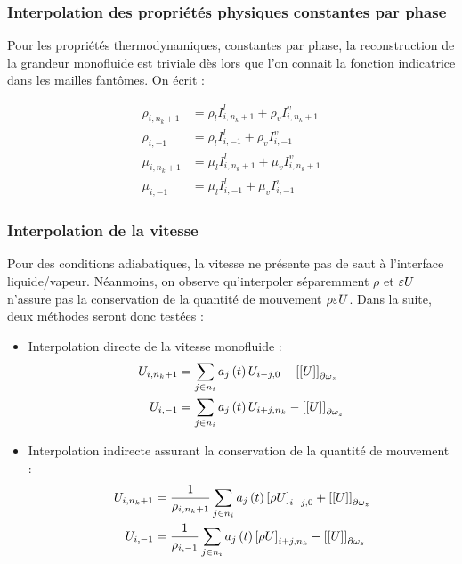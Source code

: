 \subsubsection{Interpolation des propriétés physiques constantes par phase}

Pour les propriétés thermodynamiques, constantes par phase, la reconstruction de la grandeur monofluide est triviale dès lors que l'on connait la fonction indicatrice dans les mailles fantômes. On écrit : 

\begin{align}
\rho_{i,n_k+1}&=\rho_lI^l_{i,n_k+1}+\rho_vI^v_{i,n_k+1}\label{rho1}\\
\rho_{i,-1} &= \rho_lI^l_{i,-1}+\rho_vI^v_{i,-1}\label{rho2}\\
\mu_{i,n_k+1}&=\mu_lI^l_{i,n_k+1}+\mu_vI^v_{i,n_k+1}\\
\mu_{i,-1} &= \mu_lI^l_{i,-1}+\mu_vI^v_{i,-1}
\end{align}

\subsubsection{Interpolation de la vitesse}

Pour des conditions adiabatiques, la vitesse ne présente pas de saut à l'interface liquide/vapeur.
Néanmoins, on observe qu'interpoler séparemment $\rho$ et $\varepsilon{U}$ n'assure pas la conservation de la quantité de mouvement $\rho\varepsilon{U}$. 
Dans la suite, deux méthodes seront donc testées :
\begin{itemize}
\item Interpolation directe de la vitesse monofluide : 
\begin{align}
U_{i,n_k+1}&=\sum_{j\in n_i} a_j\left( t\right)U_{i-j,0}+\left[ \left[ U\right]\right]_{\partial\omega_z}\\
U_{i,-1}&=\sum_{j\in n_{i}}a_j\left( t\right)U_{i+j,n_k}-\left[ \left[ U\right]\right]_{\partial\omega_z}
\end{align}
\item Interpolation indirecte assurant la conservation de la quantité de mouvement :
\begin{align}
U_{i,n_k+1}&=\frac{1}{\rho_{i,n_k+1}}\sum_{j\in n_i} a_j\left( t\right)\left[ \rho U\right]_{i-j,0}+\left[ \left[ U\right]\right]_{\partial\omega_z}\label{consevqdm1}\\
U_{i,-1}&=\frac{1}{\rho_{i,-1}}\sum_{j\in n_{i}}a_j\left( t\right)\left[ \rho U\right]_{i+j,n_k}-\left[ \left[ U\right]\right]_{\partial\omega_z}\label{consevqdm2}
\end{align}
\end{itemize}


